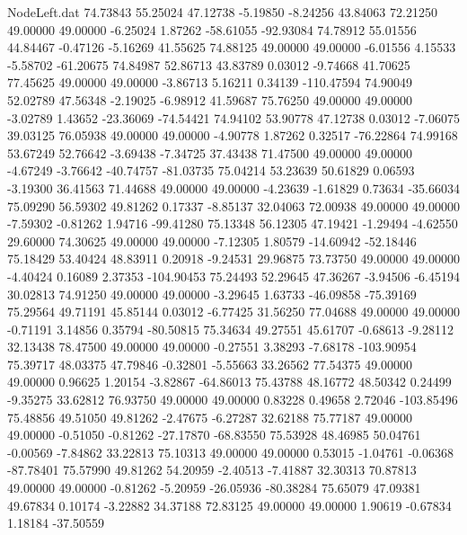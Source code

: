 \begin{filecontents}{NodeLeft.dat}
  74.73843   55.25024   47.12738    -5.19850   -8.24256   43.84063   72.21250   49.00000   49.00000   -6.25024    1.87262  -58.61055  -92.93084
  74.78912   55.01556   44.84467    -0.47126   -5.16269   41.55625   74.88125   49.00000   49.00000   -6.01556    4.15533   -5.58702  -61.20675
  74.84987   52.86713   43.83789     0.03012   -9.74668   41.70625   77.45625   49.00000   49.00000   -3.86713    5.16211    0.34139 -110.47594
  74.90049   52.02789   47.56348    -2.19025   -6.98912   41.59687   75.76250   49.00000   49.00000   -3.02789    1.43652  -23.36069  -74.54421
  74.94102   53.90778   47.12738     0.03012   -7.06075   39.03125   76.05938   49.00000   49.00000   -4.90778    1.87262    0.32517  -76.22864
  74.99168   53.67249   52.76642    -3.69438   -7.34725   37.43438   71.47500   49.00000   49.00000   -4.67249   -3.76642  -40.74757  -81.03735
  75.04214   53.23639   50.61829     0.06593   -3.19300   36.41563   71.44688   49.00000   49.00000   -4.23639   -1.61829    0.73634  -35.66034
  75.09290   56.59302   49.81262     0.17337   -8.85137   32.04063   72.00938   49.00000   49.00000   -7.59302   -0.81262    1.94716  -99.41280
  75.13348   56.12305   47.19421    -1.29494   -4.62550   29.60000   74.30625   49.00000   49.00000   -7.12305    1.80579  -14.60942  -52.18446
  75.18429   53.40424   48.83911     0.20918   -9.24531   29.96875   73.73750   49.00000   49.00000   -4.40424    0.16089    2.37353 -104.90453
  75.24493   52.29645   47.36267    -3.94506   -6.45194   30.02813   74.91250   49.00000   49.00000   -3.29645    1.63733  -46.09858  -75.39169
  75.29564   49.71191   45.85144     0.03012   -6.77425   31.56250   77.04688   49.00000   49.00000   -0.71191    3.14856    0.35794  -80.50815
  75.34634   49.27551   45.61707    -0.68613   -9.28112   32.13438   78.47500   49.00000   49.00000   -0.27551    3.38293   -7.68178 -103.90954
  75.39717   48.03375   47.79846    -0.32801   -5.55663   33.26562   77.54375   49.00000   49.00000    0.96625    1.20154   -3.82867  -64.86013
  75.43788   48.16772   48.50342     0.24499   -9.35275   33.62812   76.93750   49.00000   49.00000    0.83228    0.49658    2.72046 -103.85496
  75.48856   49.51050   49.81262    -2.47675   -6.27287   32.62188   75.77187   49.00000   49.00000   -0.51050   -0.81262  -27.17870  -68.83550
  75.53928   48.46985   50.04761    -0.00569   -7.84862   33.22813   75.10313   49.00000   49.00000    0.53015   -1.04761   -0.06368  -87.78401
  75.57990   49.81262   54.20959    -2.40513   -7.41887   32.30313   70.87813   49.00000   49.00000   -0.81262   -5.20959  -26.05936  -80.38284
  75.65079   47.09381   49.67834     0.10174   -3.22882   34.37188   72.83125   49.00000   49.00000    1.90619   -0.67834    1.18184  -37.50559

\end{filecontents}
